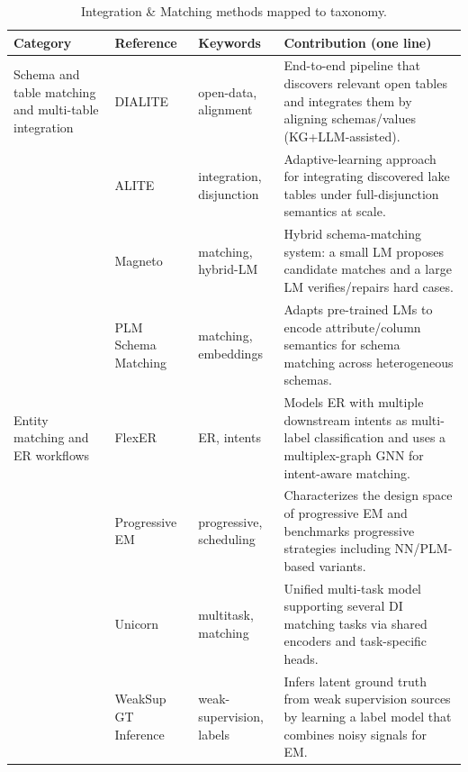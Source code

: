 \documentclass[sigconf,nonacm]{acmart}
\newcommand{\tbl}{%
  \scriptsize
  \setlength{\tabcolsep}{4pt}%
  \renewcommand{\arraystretch}{1.12}%
}
\begin{document}
\begin{table}[!htbp]
\caption{Integration \& Matching methods mapped to taxonomy.}
\label{tab:integration-methods}
\tbl
\begin{tabularx}{\textwidth}{@{}p{24mm}p{28mm}p{18mm}Y@{}}
\toprule
\textbf{Category} & \textbf{Reference} & \textbf{Keywords} & \textbf{Contribution (one line)} \\
\midrule

Schema and table matching and multi-table integration &
DIALITE~\cite{10.1145/3555041.3589732} &
open-data, alignment &
End-to-end pipeline that discovers relevant open tables and integrates them by aligning schemas/values (KG+LLM-assisted). \\

~ &
ALITE~\cite{10.14778/3574245.3574274} &
integration, disjunction &
Adaptive-learning approach for integrating discovered lake tables under full-disjunction semantics at scale. \\

~ &
Magneto~\cite{10.14778/3742728.3742757} &
matching, hybrid-LM &
Hybrid schema-matching system: a small LM proposes candidate matches and a large LM verifies/repairs hard cases. \\

~ &
PLM Schema Matching~\cite{10184612} &
matching, embeddings &
Adapts pre-trained LMs to encode attribute/column semantics for schema matching across heterogeneous schemas. \\

\midrule

Entity matching and ER workflows &
FlexER~\cite{10.1145/3588722} &
ER, intents &
Models ER with multiple downstream intents as multi-label classification and uses a multiplex-graph GNN for intent-aware matching. \\

~ &
Progressive EM~\cite{10.1145/3709715} &
progressive, scheduling &
Characterizes the design space of progressive EM and benchmarks progressive strategies including NN/PLM-based variants. \\

~ &
Unicorn~\cite{10.1145/3588938} &
multitask, matching &
Unified multi-task model supporting several DI matching tasks via shared encoders and task-specific heads. \\

~ &
WeakSup GT Inference~\cite{10.1145/3588712} &
weak-supervision, labels &
Infers latent ground truth from weak supervision sources by learning a label model that combines noisy signals for EM. \\


\end{tabularx}
\end{table}
\end{document}
